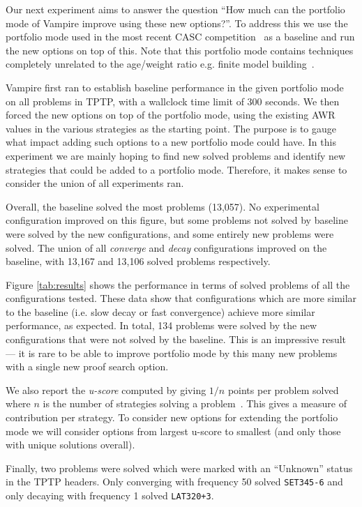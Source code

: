 \documentclass{llncs}
\begin{document}
Our next experiment aims to answer the question ``How much can the portfolio mode of Vampire improve using these new options?''.
To address this we use the portfolio mode used in the most recent CASC competition~\cite{CADE18} as a baseline and run the new options on top of this.
Note that this portfolio mode contains techniques completely unrelated to the age/weight ratio e.g. finite model building~\cite{fmb}. 

Vampire first ran to establish baseline performance in the given portfolio mode on all problems in TPTP, with a wallclock time limit of 300 seconds. We then forced the new options on top of the portfolio mode, using the existing AWR values in the various strategies as the starting point. The purpose is to gauge what impact adding such options to a new portfolio mode could have. In this experiment we are mainly hoping to find new solved problems and identify new strategies that could be added to a portfolio mode. Therefore, it makes sense to consider the union of all experiments ran.

Overall, the baseline solved the most problems (13,057). 
No experimental configuration improved on this figure, but some problems not solved by baseline were solved by the new configurations, and some entirely new problems were solved.
The union of all \emph{converge} and \emph{decay} configurations improved on the baseline, with 13,167 and 13,106 solved problems respectively.

Figure \ref{tab:results} shows the performance in terms of solved problems of all the configurations tested.
These data show that configurations which are more similar to the baseline (i.e. slow decay or fast convergence) achieve more similar performance, as expected.
In total, 134 problems were solved by the new configurations that were not solved by the baseline. This is an impressive result --- it is rare to be able to improve portfolio mode by this many new problems with a single new proof search option.  

We also report the \emph{u-score} computed by giving $1/n$ points per problem solved where $n$ is the number of strategies solving a problem~\cite{u-score}.
This gives a measure of contribution per strategy. To consider new options for extending the portfolio mode we will consider options from largest u-score to smallest (and only those with unique solutions overall).

Finally, two problems were solved which were marked with an ``Unknown'' status in the TPTP headers.
Only converging with frequency 50 solved \texttt{SET345-6} and only decaying with frequency 1 solved \texttt{LAT320+3}.
\end{document}
